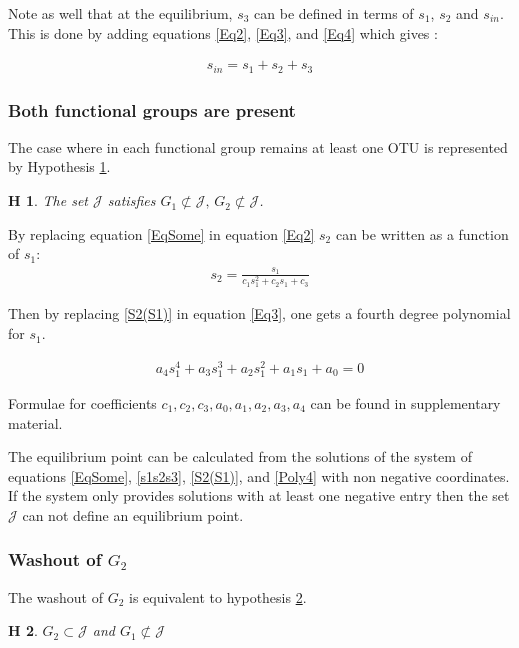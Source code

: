 \documentclass[3p,times]{article}
\newtheorem{hypo}{H}
\begin{document}
Note as well that at the equilibrium, $s_3$ can be defined in terms of $s_1$, $s_2$ and $s_{in}$. This is done by adding equations \eqref{Eq2}, \eqref{Eq3},  and \eqref{Eq4} which gives :

\begin{align}
s_{in} = s_1+s_2+s_3 \label{s1s2s3}
\end{align}

\subsubsection{Both functional groups are present}

The case where in each functional group remains at least one OTU is represented by Hypothesis \ref{hypothesis CN}.
\begin{hypo}The set $\mathcal{J}$ satisfies $ G_1 \not \subset \mathcal{J} , \, G_2 \not \subset \mathcal{J} $.
	\label{hypothesis CN}
\end{hypo} 


By replacing equation \eqref{EqSome} in equation \eqref{Eq2} $s_2$ can be written as a function of $s_1$:
\begin{align}
s_2 = \frac{s_1}{c_1s_1^2+c_2s_1+c_3} \label{S2(S1)}
\end{align}


Then by replacing  \eqref{S2(S1)} in equation \eqref{Eq3}, one gets a fourth degree polynomial for $s_1$. 

\begin{align}
\label{Poly4} a_4s_1^4+a_3s_1^3+a_2s_1^2+a_1s_1+a_0 = 0
\end{align}


Formulae for coefficients $c_1, c_2, c_3, a_0, a_1, a_2, a_3, a_4$ can be found in supplementary material. 

The equilibrium point can be calculated from the solutions of the system of equations \eqref{EqSome}, \eqref{s1s2s3}, \eqref{S2(S1)}, and \eqref{Poly4} with non negative coordinates. If the system only provides solutions with at least one negative entry then the set $\mathcal{J}$ can not define an equilibrium point.


\subsubsection{Washout of $G_2$}

The washout of $G_2$ is equivalent to  hypothesis \ref{hypothesis washout G2}.

\begin{hypo}
	$G_2 \subset \mathcal{J}$ and $G_1 \not \subset \mathcal{J}$
	\label{hypothesis washout G2}
\end{hypo} 
\end{document}
